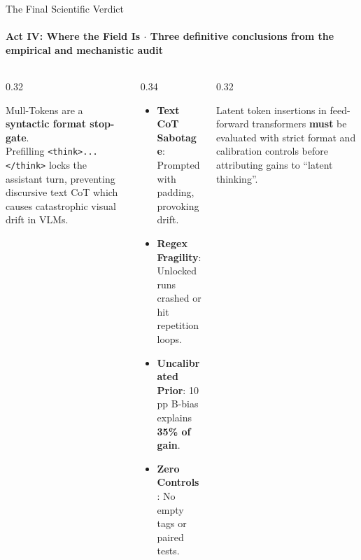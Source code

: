 \documentclass[aspectratio=169, 10pt]{beamer}
\begin{document}
\begin{frame}{The Final Scientific Verdict}
  \framesubtitle{Act IV: Where the Field Is $\cdot$ Three definitive conclusions from the empirical and mechanistic audit}
  
  \begin{columns}[T]
    \begin{column}{0.32\textwidth}
      \begin{tcolorbox}[accentcard, title=\textbf{1. What Mull Is}]
        \scriptsize
        Mull-Tokens are a \textbf{syntactic format stop-gate}.\\
        \vspace{3pt}
        Prefilling \texttt{<think>...</think>} locks the assistant turn, preventing discursive text CoT which causes catastrophic visual drift in VLMs.
      \end{tcolorbox}
    \end{column}
    
    \begin{column}{0.34\textwidth}
      \begin{tcolorbox}[alertcard, title=\textbf{2. Why Paper Flawed}]
        \scriptsize
        \begin{itemize}\setlength{\itemsep}{2pt}
          \item \textbf{Text CoT Sabotage}: Prompted with padding, provoking drift.
          \item \textbf{Regex Fragility}: Unlocked runs crashed or hit repetition loops.
          \item \textbf{Uncalibrated Prior}: 10 pp B-bias explains \textbf{35\% of gain}.
          \item \textbf{Zero Controls}: No empty tags or paired tests.
        \end{itemize}
      \end{tcolorbox}
    \end{column}
    
    \begin{column}{0.32\textwidth}
      \begin{tcolorbox}[successcard, title=\textbf{3. Field Takeaway}]
        \scriptsize
        Latent token insertions in feed-forward transformers \textbf{must} be evaluated with strict format and calibration controls before attributing gains to ``latent thinking''.
      \end{tcolorbox}
    \end{column}
  \end{columns}

\end{frame}
\end{document}
